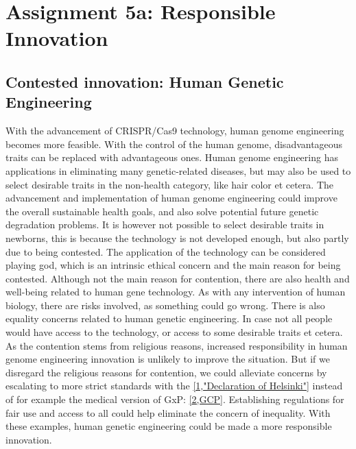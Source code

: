 \section*{Assignment 5a: Responsible Innovation}

\subsection*{Contested innovation: Human Genetic Engineering}
With the advancement of CRISPR/Cas9 technology, human genome engineering becomes more feasible. With the control of the human genome, disadvantageous traits can be replaced with advantageous ones.
Human genome engineering has applications in eliminating many genetic-related diseases, but may also be used to select desirable traits in the non-health category, like hair color et cetera. 
The advancement and implementation of human genome engineering could improve the overall sustainable health goals, and also solve potential future genetic degradation problems.
It is however not possible to select desirable traits in newborns, this is because the technology is not developed enough, but also partly due to being contested. 
The application of the technology can be considered playing god, which is an intrinsic ethical concern and the main reason for being contested. 
Although not the main reason for contention, there are also health and well-being related to human gene technology. 
As with any intervention of human biology, there are risks involved, as something could go wrong. 
There is also equality concerns related to human genetic engineering.
In case not all people would have access to the technology, or access to some desirable traits et cetera.
As the contention stems from religious reasons, increased responsibility in human genome engineering innovation is unlikely to improve the situation. 
But if we disregard the religious reasons for contention, we could alleviate concerns by escalating to more strict standards with the \href{https://www.wma.net/what-we-do/medical-ethics/declaration-of-helsinki/}{[1,"Declaration of Helsinki"]} instead of for example the medical version of GxP: \href{https://www.fda.gov/about-fda/center-drug-evaluation-and-research-cder/good-clinical-practice}{[2,GCP]}. 
Establishing regulations for fair use and access to all could help eliminate the concern of inequality. 
With these examples, human genetic engineering could be made a more responsible innovation.

